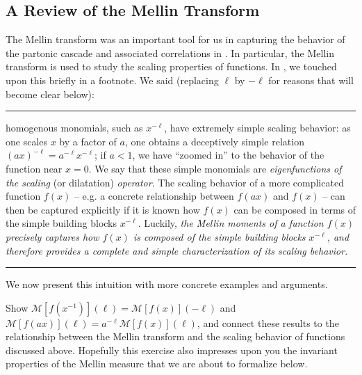 \begin{subappendices}
\section{A Review of the Mellin Transform}
\label{app:mellin}

The Mellin transform was an important tool for us in capturing the behavior of the partonic cascade and associated correlations in .
%
In particular, the Mellin transform is used to study the scaling properties of functions.
%
In , we touched upon this briefly in a footnote.
%
We said (replacing \(\ell\) by \(-\ell\) for reasons that will become clear below):

\vspace{7pt}
\hrule
\vspace{7pt}

homogenous monomials, such as \(x^{-\ell}\), have extremely simple scaling behavior:
%
as one scales \(x\) by a factor of \(a\), one obtains a deceptively simple relation \((a x)^{-\ell} = a^{-\ell} x^{-\ell}\);
%
if \(a < 1\), we have ``zoomed in'' to the behavior of the function near \(x = 0\).
%
We say that these simple monomials are \textit{eigenfunctions of the scaling} (or dilatation) \textit{operator}.
%
The scaling behavior of a more complicated function \(f(x)\) -- e.g. a concrete relationship between \(f(ax)\) and \(f(x)\) -- can then be captured explicitly if it is known how \(f(x)\) can be composed in terms of the simple building blocks \(x^{-\ell}\).
%
Luckily, \textit{the Mellin moments of a function \(f(x)\) precisely captures how \(f(x)\) is composed of the simple building blocks \(x^{-\ell}\), and therefore provides a complete and simple characterization of its scaling behavior.}

\vspace{7pt}
\hrule
\vspace{7pt}


We now present this intuition with more concrete examples and arguments.

\begin{exercise}
    Show \(\mathcal{M}[f(x^{-1})](\ell) = \mathcal{M}[f(x)](-\ell)\) and \(\mathcal{M}[f(a x)](\ell) = a^{-\ell} \mathcal{M}[f(x)](\ell)\), and connect these results to the relationship between the Mellin transform and the scaling behavior of functions discussed above.
    Hopefully this exercise also impresses upon you the invariant properties of the Mellin measure that we are about to formalize below.
\end{exercise}



\end{subappendices}

